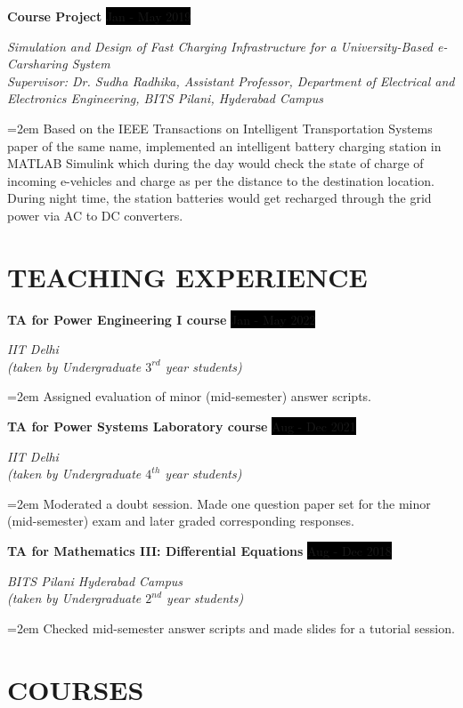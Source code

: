 \documentclass[paper=a4,fontsize=11pt]{scrartcl} %
\newcommand{\sepspace}{\vspace*{1em}}		%
\newcommand{\NewPart}[1]{\section*{\uppercase{#1}}}
\newcommand{\EducationEntry}[4]{
		\noindent \textbf{#1} \hfill      %
		\colorbox{Black}{%
			\parbox{6em}{%
			\hfill\color{White}#2}} \par  %
		\noindent \textit{#3} \par        %
		\noindent\hangindent=2em\hangafter=0 \small #4 %
		\normalsize \par}
\newcommand{\WorkEntry}[4]{				  %
		\noindent \textbf{#1} \hfill      %
		\colorbox{Black}{\color{White}#2} \par  %
		\noindent \textit{#3} \par              %
		\noindent\hangindent=2em\hangafter=0 \small #4 %
		\normalsize \par}
\begin{document}
\sepspace
\WorkEntry{Course Project}{Jan - May 2019}{Simulation and Design of Fast Charging Infrastructure for a University-Based e-Carsharing System\\ Supervisor: Dr. Sudha Radhika, Assistant Professor, Department of Electrical and Electronics Engineering, BITS Pilani, Hyderabad Campus}{Based on the IEEE Transactions on Intelligent Transportation Systems paper of the same name, implemented an intelligent battery charging station in MATLAB Simulink which during the day would check the state of charge of incoming e-vehicles and charge as per the distance to the destination location. During night time, the station batteries would get recharged through the grid power via AC to DC converters.}

\NewPart{Teaching Experience}{}

\WorkEntry{TA for Power Engineering I course}{Jan - May 2022}{IIT Delhi\\ (taken by Undergraduate $3^{rd}$ year students)}{Assigned evaluation of minor (mid-semester) answer scripts.}
\sepspace

\WorkEntry{TA for Power Systems Laboratory course}{Aug - Dec 2021}{IIT Delhi\\ (taken by Undergraduate $4^{th}$ year students)}{Moderated a doubt session. Made one question paper set for the minor (mid-semester) exam and later graded corresponding responses.}
\sepspace
\sepspace
\WorkEntry{TA for Mathematics III: Differential Equations}{Aug - Dec 2018}{BITS Pilani Hyderabad Campus\\ (taken by Undergraduate $2^{nd}$ year students)}{Checked mid-semester answer scripts and made slides for a tutorial session.}

\NewPart{Courses}{}
\end{document}
